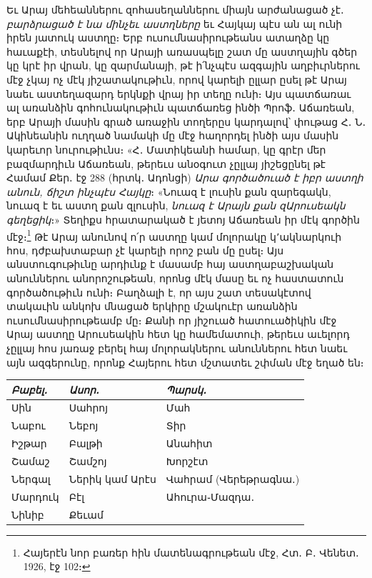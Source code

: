 \documentclass{article}
\begin{document}
{Եւ Արայ մեհեաններու զոհասեղաններու միայն արժանացած չէ․ \emph{բարձրացած է նա մինչեւ աստղները} եւ Հայկայ պէս ան ալ ունի իրեն յատուկ աստղը։ Երբ ուսումնասիրութեանս ատաղձը կը հաւաքէի, տեսնելով որ Արայի առասպելը շատ մը աստղային գծեր կը կրէ իր վրան, կը զարմանայի, թէ ի՛նչպէս ազգային աղբիւրներու մէջ չկայ ոչ մէկ յիշատակութիւն, որով կարելի ըլլար ըսել թէ Արայ նաեւ աստեղազարդ երկնքի վրայ իր տեղը ունի։ Այս պատճառաւ ալ առանձին գոհունակութիւն պատճառեց ինծի Պրոֆ․ Աճառեան, երբ Արայի մասին գրած առաջին տողերըս կարդալով՝ փութաց Հ․ Ն․ Ակինեանին ուղղած նամակի մը մէջ հաղորդել ինծի այս մասին կարեւոր նուրութիւնս։ «Հ․ Մատիկեանի համար, կը գրէր մեր բազմարդիւն Աճառեան, թերեւս անօգուտ չըլլայ յիշեցընել թէ Համամ Քեր․ էջ 288 (հրտկ․ Ադոնցի) \emph{Արա գործածուած է իբր աստղի անուն, ճիշտ ինչպէս Հայկը}։ «Նուազ է լուսին քան զարեգակն, նուազ է եւ աստղ քան զլուսին, \emph{նուազ է Արայն քան զԱրուսեակն գեղեցիկ}։» Տեղիքս հրատարակած է յետոյ Աճառեան իր մէկ գործին մէջ։\footnote{Հայերէն նոր բառեր հին մատենագրութեան մէջ, Հտ․ Բ․ Վենետ․ 1926, էջ 102։} Թէ Արայ անունով ո՛ր աստղը կամ մոլորակը կ՚ակնարկուի հոս, դժբախտաբար չէ կարելի որոշ բան մը ըսել։ Այս անստուգութիւնը արդիւնք է մասամբ հայ աստղաբաշխական անուններու անորոշութեան, որոնց մէկ մասը եւ ոչ հաստատուն գործածութիւն ունի։ Բաղձալի է, որ այս շատ տեսակէտով տակաւին անկոխ մնացած երկիրը մշակուէր առանձին ուսումնասիրութեամբ մը։ Քանի որ յիշուած հատուածիկին մէջ Արայ աստղը Արուսեակին հետ կը համեմատուի, թերեւս աւելորդ չըլլայ հոս յառաջ բերել հայ մոլորակներու անուններու հետ նաեւ այն ազգերունը, որոնք Հայերու հետ մշտատեւ շփման մէջ եղած են։}

\begin{table}[H]
    \centering
    \arm
    \small
    \begin{tabular}{l l l}
        \emph{Բաբել․}  &  \emph{Ասոր․}         &  \emph{Պարսկ․}              \\ \hline
         Սին       &  Սահրոյ          &  Մահ                   \\
         Նաբու     &  Նեբոյ           &  Տիր                   \\ 
         Իշթար     &  Բալթի           &  Անահիտ                \\ 
         Շամաշ     &  Շամշոյ          &  Խորշէտ                \\
         Ներգալ    &  Ներիկ կամ Արէս  &  Վահրամ (Վերեթրագնա․)  \\ 
         Մարդուկ   &  Բէլ             &  Ահուրա֊Մազդա․         \\
         Նինիբ     &  Քեւամ           & ~ \\
    \end{tabular}
\end{table}
\end{document}
